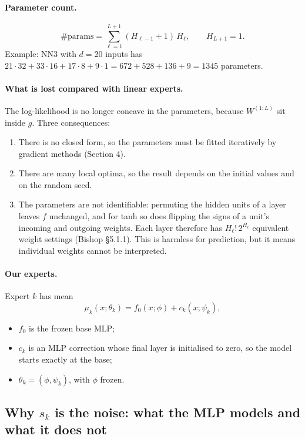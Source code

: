 \paragraph{Parameter count.}
\begin{equation}
\#\text{params}=\sum_{\ell=1}^{L+1}(H_{\ell-1}+1)\,H_\ell,\qquad H_{L+1}=1.
\end{equation}
Example: NN3 with $d=20$ inputs has $21\cdot32+33\cdot16+17\cdot8+9\cdot1=672+528+136+9=1345$ parameters.

\paragraph{What is lost compared with linear experts.} The log-likelihood is no longer concave in the parameters, because $W^{(1:L)}$ sit inside $g$. Three consequences:
\begin{enumerate}
  \item There is no closed form, so the parameters must be fitted iteratively by gradient methods (Section 4).
  \item There are many local optima, so the result depends on the initial values and on the random seed.
  \item The parameters are not identifiable: permuting the hidden units of a layer leaves $f$ unchanged, and for tanh so does flipping the signs of a unit's incoming and outgoing weights. Each layer therefore has $H_\ell!\,2^{H_\ell}$ equivalent weight settings (Bishop \S5.1.1). This is harmless for prediction, but it means individual weights cannot be interpreted.
\end{enumerate}

\paragraph{Our experts.} Expert $k$ has mean
\begin{equation}
\mu_k(x;\theta_k)=f_0(x;\phi)+c_k(x;\psi_k),
\end{equation}
\begin{itemize}
  \item $f_0$ is the frozen base MLP;
  \item $c_k$ is an MLP correction whose final layer is initialised to zero, so the model starts exactly at the base;
  \item $\theta_k=(\phi,\psi_k)$, with $\phi$ frozen.
\end{itemize}

\subsection{Why $s_k$ is the noise: what the MLP models and what it does not}


